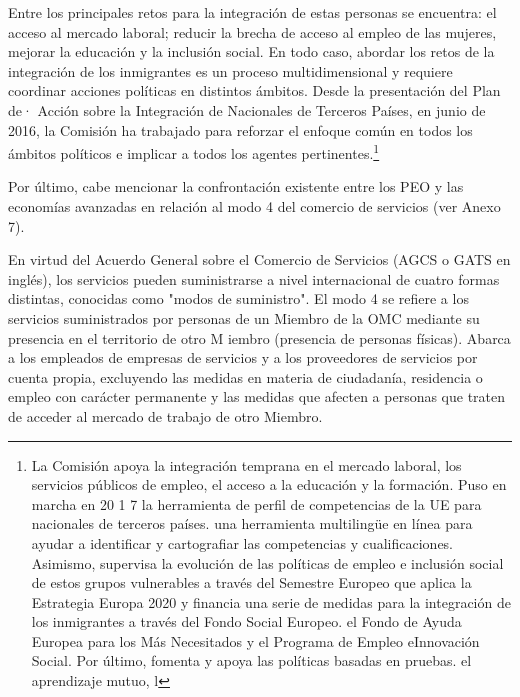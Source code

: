 \documentclass[10pt,a4paper]{article}
\begin{document}
Entre los principales retos para la integración de estas personas se encuentra: el acceso al mercado laboral; reducir la brecha de acceso al empleo de las mujeres, mejorar la educación y la inclusión social. En todo caso, abordar los retos de la integración de los inmigrantes es un proceso multidimensional y requiere coordinar acciones políticas en distintos ámbitos. Desde la presentación del Plan de· Acción sobre la Integración de Nacionales de Terceros Países, en junio de 2016, la Comisión ha trabajado para reforzar el enfoque común en todos los ámbitos políticos e implicar a todos los agentes pertinentes.\footnote{%
    La Comisión apoya la integración temprana en el mercado laboral, los servicios públicos de empleo, el acceso a la educación y la formación. Puso en marcha en 20 1 7 la herramienta de perfil de competencias de la UE para nacionales de terceros países. una herramienta multilingüe en línea para ayudar a identificar y cartografiar las competencias y cualificaciones. Asimismo, supervisa la evolución de las políticas de empleo e inclusión social de estos grupos vulnerables a través del Semestre Europeo que aplica la Estrategia Europa 2020 y financia una serie de medidas para la integración de los inmigrantes a través del Fondo Social Europeo. el Fondo de Ayuda Europea para los Más Necesitados y el Programa de Empleo eInnovación Social. Por último, fomenta y apoya las políticas basadas en pruebas. el aprendizaje mutuo, l
}

Por último, cabe mencionar la confrontación existente entre los PEO y las economías avanzadas en relación al modo 4 del comercio de servicios (ver Anexo 7).

En virtud del Acuerdo General sobre el Comercio de Servicios (AGCS o GATS en inglés), los servicios pueden suministrarse a nivel internacional de cuatro formas distintas, conocidas como "modos de suministro". El modo 4 se refiere a los servicios suministrados por personas de un Miembro de la OMC mediante su presencia en el territorio de otro M iembro (presencia de personas físicas). Abarca a los empleados de empresas de servicios y a los proveedores de servicios por cuenta propia, excluyendo las medidas en materia de ciudadanía, residencia o empleo con carácter permanente y las medidas que afecten a personas que traten de acceder al mercado de trabajo de otro Miembro.
\end{document}

